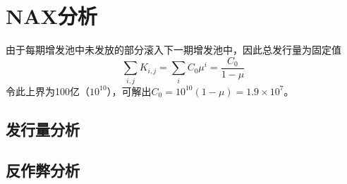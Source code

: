 \section{NAX分析}
由于每期增发池中未发放的部分滚入下一期增发池中，因此总发行量为固定值
\begin{equation}
  \sum_{i,j} K_{i,j} = \sum_i C_0 \mu^i = \frac{C_0}{1-\mu}
  \end{equation}
  令此上界为100亿（\(10^{10}\)），可解出\(C_0 = 10^{10}(1-\mu) = 1.9\times10^7\)。

\subsection{发行量分析}


\subsection{反作弊分析}
